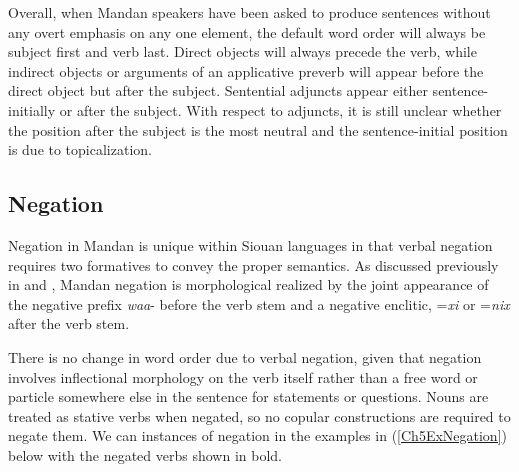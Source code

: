Overall, when Mandan speakers have been asked to produce sentences without any overt emphasis on any one element, the default word order will always be subject first and verb last. Direct objects will always precede the verb, while indirect objects or arguments of an applicative preverb will appear before the direct object but after the subject. Sentential adjuncts appear either sentence-initially or after the subject. With respect to adjuncts, it is still unclear whether the position after the subject is the most neutral and the sentence-initial position is due to topicalization.

\subsection{Negation}\label{Ch5Negation}

Negation in Mandan is unique within Siouan languages in that verbal negation requires two formatives to convey the proper semantics. As discussed previously in  and , Mandan negation is morphological realized by the joint appearance of the negative prefix \textit{waa}- before the verb stem and a negative enclitic, =\textit{xi} or =\textit{nix} after the verb stem.

There is no change in word order due to verbal negation, given that negation involves inflectional morphology on the verb itself rather than a free word or particle somewhere else in the sentence for statements or questions. Nouns are treated as stative verbs when negated, so no copular constructions are required to negate them. We can instances of negation in the examples in (\ref{Ch5ExNegation}) below with the negated verbs shown in bold.

